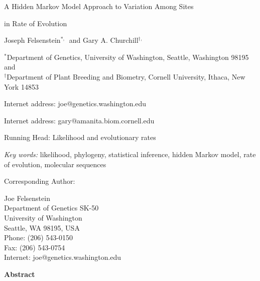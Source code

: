 \documentclass[12pt]{article}
\begin{document}
\newcommand{\prob}{{\rm\;Prob\;}}
\begin{bf}
\vspace{1in}

\centerline{A Hidden Markov Model Approach to Variation Among Sites}
\centerline{in Rate of Evolution}
\vspace{0.5in}

\end{bf}

\centerline{Joseph Felsenstein\(^{*,}\)\footnotemark ~and Gary A. Churchill\(^{\dag,}\)\footnotemark}
\bigskip

\noindent
\(^*\)Department of Genetics, University of Washington, Seattle, Washington 98195 and\\
\(^{\dag}\)Department of Plant Breeding and Biometry, Cornell University, Ithaca, New York 14853

\vspace{0.5in}


\footnotemark[1]Internet address: joe@genetics.washington.edu

\footnotemark[2]Internet address: gary@amanita.biom.cornell.edu


\vspace{0.4in}

\centerline{Running Head:  Likelihood and evolutionary rates}
\bigskip



{\it Key words:}  likelihood, phylogeny, statistical inference, hidden Markov
model, rate of evolution, molecular sequences
\bigskip

\begin{flushleft}
Corresponding Author:\\
\medskip

Joe Felsenstein\\
Department of Genetics SK-50\\
University of Washington\\
Seattle, WA 98195, USA\\
\medskip
Phone: (206) 543-0150\\
Fax: (206) 543-0754\\
Internet: joe@genetics.washington.edu
\end{flushleft}

\newpage

\centerline{\bf Abstract}
\end{document}
